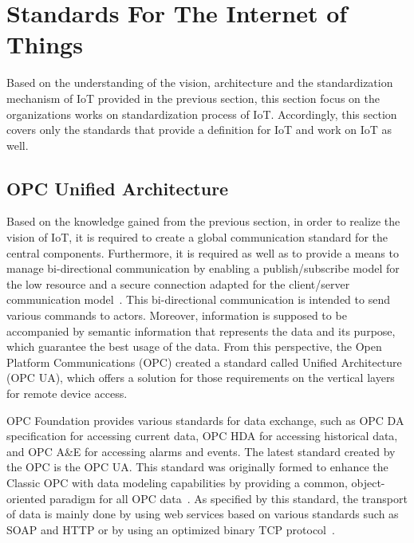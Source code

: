 \section{Standards For The Internet of Things }
Based on the understanding of the vision, architecture and the standardization mechanism of IoT provided in the previous section, this section focus on the organizations works on standardization process of IoT. Accordingly, this section covers only the standards that provide a definition for IoT and work on IoT as well.

\subsection{OPC Unified Architecture}

Based on the knowledge gained from the previous section, in order to realize the vision of IoT, it is required to create a global communication standard for the central components. Furthermore, it is required as well as to provide a means to manage bi-directional communication by enabling a publish/subscribe model for the low resource and a secure connection adapted for the client/server communication model~\cite{bookua}. This bi-directional communication is intended to send various commands to actors. Moreover, information is supposed to be accompanied by semantic information that represents the data and its purpose, which guarantee the best usage of the data. From this perspective, the Open Platform Communications (OPC) created a standard called Unified Architecture (OPC UA), which offers a solution for those requirements on the vertical layers for remote device access.

OPC Foundation provides various standards for data exchange, such as OPC DA specification for accessing current data, OPC HDA for accessing historical data, and OPC A&E for accessing alarms and events. The latest standard created by the OPC is the OPC UA. This standard was originally formed to enhance the Classic OPC with data modeling capabilities by providing a common, object-oriented paradigm for all OPC data~\cite{bookua}. As specified by this standard, the transport of data is mainly done by using web services based on various standards such as SOAP and HTTP or by using an optimized binary TCP protocol~\cite{bookua}. \par

